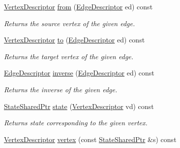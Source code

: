 \begin{DoxyCompactItemize}
\hyperlink{structslb_1_1core_1_1ui_1_1StateGraph_ab2d88fce7d30dc6346910900212a7e6d}{Vertex\+Descriptor} \hyperlink{structslb_1_1core_1_1ui_1_1StateGraph_ab706be51cb6a847bcc7ec3eacb569abb}{from} (\hyperlink{structslb_1_1core_1_1ui_1_1StateGraph_a7e894f002383b1687652a91549c3656d}{Edge\+Descriptor} ed) const 
\begin{DoxyCompactList}\small\item\em Returns the source vertex of the given edge. \end{DoxyCompactList}\item 
\hyperlink{structslb_1_1core_1_1ui_1_1StateGraph_ab2d88fce7d30dc6346910900212a7e6d}{Vertex\+Descriptor} \hyperlink{structslb_1_1core_1_1ui_1_1StateGraph_a96f73bac974845d5b2d039e88b23289f}{to} (\hyperlink{structslb_1_1core_1_1ui_1_1StateGraph_a7e894f002383b1687652a91549c3656d}{Edge\+Descriptor} ed) const 
\begin{DoxyCompactList}\small\item\em Returns the target vertex of the given edge. \end{DoxyCompactList}\item 
\hyperlink{structslb_1_1core_1_1ui_1_1StateGraph_a7e894f002383b1687652a91549c3656d}{Edge\+Descriptor} \hyperlink{structslb_1_1core_1_1ui_1_1StateGraph_a08f262bf14c187ffbfc20751776dd4f9}{inverse} (\hyperlink{structslb_1_1core_1_1ui_1_1StateGraph_a7e894f002383b1687652a91549c3656d}{Edge\+Descriptor} ed) const 
\begin{DoxyCompactList}\small\item\em Returns the inverse of the given edge. \end{DoxyCompactList}\item 
\hyperlink{structslb_1_1core_1_1ui_1_1StateGraph_a367045176eaaf1580231bf5a4c35e2f8}{State\+Shared\+Ptr} \hyperlink{structslb_1_1core_1_1ui_1_1StateGraph_ac753df12e05c3727c06591f0e9a9a63b}{state} (\hyperlink{structslb_1_1core_1_1ui_1_1StateGraph_ab2d88fce7d30dc6346910900212a7e6d}{Vertex\+Descriptor} vd) const 
\begin{DoxyCompactList}\small\item\em Returns state corresponding to the given vertex. \end{DoxyCompactList}\item 
\hyperlink{structslb_1_1core_1_1ui_1_1StateGraph_ab2d88fce7d30dc6346910900212a7e6d}{Vertex\+Descriptor} \hyperlink{structslb_1_1core_1_1ui_1_1StateGraph_ac2bf05da4085a606436a97d9a21fceec}{vertex} (const \hyperlink{structslb_1_1core_1_1ui_1_1StateGraph_a367045176eaaf1580231bf5a4c35e2f8}{State\+Shared\+Ptr} \&s) const 

\end{DoxyCompactItemize}
